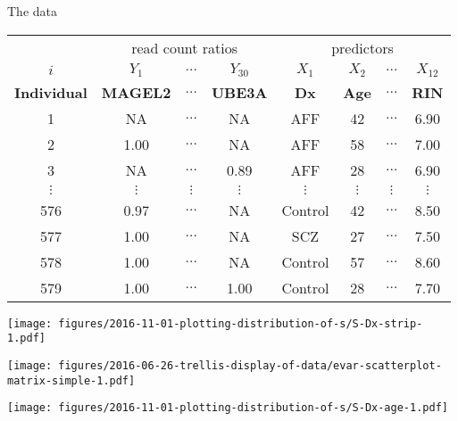 \documentclass[usenames,dvipsnames]{beamer} %
\begin{document}
\begin{frame}{The data}
\footnotesize
\begin{tabular}{|c|ccc|cccc|}
 & \multicolumn{3}{|c|}{read count ratios} & \multicolumn{4}{|c|}{predictors} \\
\(i\) & \(Y_1\) & \(\hdots\) & \(Y_{30}\) & \(X_1\) & \(X_2\) & \(\hdots\) & \(X_{12}\) \\
\textbf{Individual} & \textbf{MAGEL2} & \(\hdots\) & \textbf{UBE3A} & \textbf{Dx} & \textbf{Age} & \(\hdots\) & \textbf{RIN} \\
\hline
1 & NA & \(\hdots\) & NA & AFF & 42 & \(\hdots\) & 6.90 \\
2 & 1.00 & \(\hdots\) & NA & AFF & 58 & \(\hdots\) & 7.00 \\
3 & NA & \(\hdots\) & 0.89 & AFF & 28 & \(\hdots\) & 6.90 \\
\(\vdots\) & \(\vdots\) & \(\vdots\) & \(\vdots\) & \(\vdots\) & \(\vdots\) & \(\vdots\) & \(\vdots\) \\
576 & 0.97 & \(\hdots\) & NA & Control & 42 & \(\hdots\) & 8.50 \\
577 & 1.00 & \(\hdots\) & NA & SCZ & 27 & \(\hdots\) & 7.50 \\
578 & 1.00 & \(\hdots\) & NA & Control & 57 & \(\hdots\) & 8.60 \\
579 & 1.00 & \(\hdots\) & 1.00 & Control & 28 & \(\hdots\) & 7.70 \\
\end{tabular}
\end{frame}

\begin{frame}%
\begin{center}
\texttt{[image: figures/2016-11-01-plotting-distribution-of-s/S-Dx-strip-1.pdf]}
\end{center}
\end{frame}

\begin{frame}%
\begin{center}
\texttt{[image: figures/2016-06-26-trellis-display-of-data/evar-scatterplot-matrix-simple-1.pdf]}
\end{center}
\end{frame}

\begin{frame}[label=S-Age]
\begin{center}
\texttt{[image: figures/2016-11-01-plotting-distribution-of-s/S-Dx-age-1.pdf]}
\end{center}
\end{frame}
\end{document}
